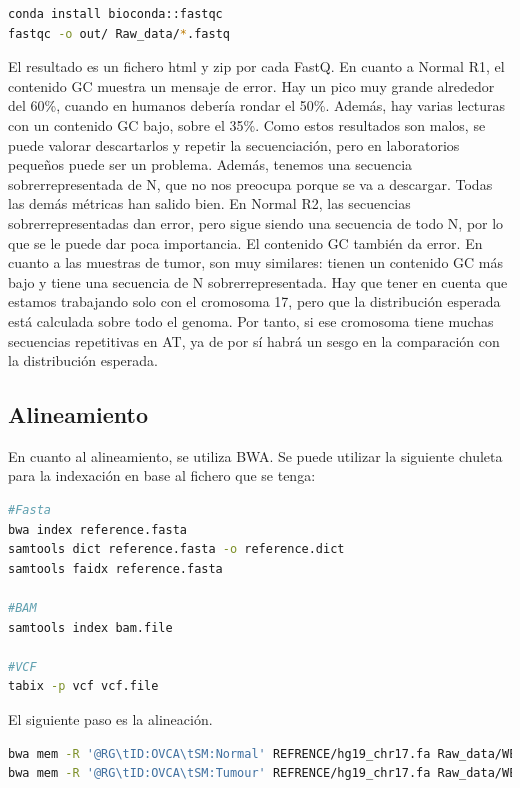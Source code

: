 \begin{lstlisting}[language=bash]
conda install bioconda::fastqc
fastqc -o out/ Raw_data/*.fastq
\end{lstlisting}

El resultado es un fichero html y zip por cada FastQ. En cuanto a Normal R1, el contenido GC muestra un mensaje de error. Hay un pico muy grande alrededor del 60\%, cuando en humanos debería rondar el 50\%. Además, hay varias lecturas con un contenido GC bajo, sobre el 35\%. Como estos resultados son malos, se puede valorar descartarlos y repetir la secuenciación, pero en laboratorios pequeños puede ser un problema. Además, tenemos una secuencia sobrerrepresentada de N, que no nos preocupa porque se va a descargar. Todas las demás métricas han salido bien. En Normal R2, las secuencias sobrerrepresentadas dan error, pero sigue siendo una secuencia de todo N, por lo que se le puede dar poca importancia. El contenido GC también da error. En cuanto a las muestras de tumor, son muy similares: tienen un contenido GC más bajo y tiene una secuencia de N sobrerrepresentada. 
Hay que tener en cuenta que estamos trabajando solo con el cromosoma 17, pero que la distribución esperada está calculada sobre todo el genoma. Por tanto, si ese cromosoma tiene muchas secuencias repetitivas en AT, ya de por sí habrá un sesgo en la comparación con la distribución esperada. 

\subsection{Alineamiento}
En cuanto al alineamiento, se utiliza BWA. Se puede utilizar la siguiente chuleta para la indexación en base al fichero que se tenga:
\begin{lstlisting}[language=bash]
#Fasta
bwa index reference.fasta
samtools dict reference.fasta -o reference.dict
samtools faidx reference.fasta

#BAM
samtools index bam.file

#VCF
tabix -p vcf vcf.file
\end{lstlisting}

El siguiente paso es la alineación.
\begin{lstlisting}[language=bash]
bwa mem -R '@RG\tID:OVCA\tSM:Normal' REFRENCE/hg19_chr17.fa Raw_data/WEx_Normal_R1.fastq Raw_data/WEx_Normal_R2.fastq > alignment/normal.sam
bwa mem -R '@RG\tID:OVCA\tSM:Tumour' REFRENCE/hg19_chr17.fa Raw_data/WEx_Tumour_R1.fastq Raw_data/WEx_Tumour_R2.fastq > alignment/tumour.sam
\end{lstlisting}

